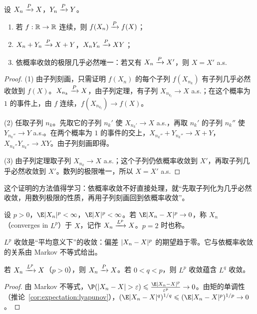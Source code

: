 \begin{corollary}[依概率收敛的运算]\label{cor:convergence:continuous-mapping}
设 $X_n\xrightarrow{P} X$，$Y_n\xrightarrow{P} Y$。
\begin{enumerate}
\item 若 $f:\mathbb{R}\to\mathbb{R}$ 连续，则 $f(X_n)\xrightarrow{P} f(X)$；
\item $X_n+Y_n\xrightarrow{P} X+Y$，$X_nY_n\xrightarrow{P} XY$；
\item 依概率收敛的极限几乎必然唯一：若又有 $X_n\xrightarrow{P} X'$，则 $X=X'$ a.s.
\end{enumerate}
\end{corollary}
\begin{proof}
(1) 由子列刻画，只需证明 $f(X_n)$ 的每个子列 $f(X_{n_k})$ 有子列几乎必然收敛到 $f(X)$。$X_{n_k}\xrightarrow{P} X$，由子列定理，有子列 $X_{n_{k_l}}\to X$ a.s.；在这个概率为 $1$ 的事件上，由 $f$ 连续，$f(X_{n_{k_l}})\to f(X)$。

(2) 任取子列 $n_k$。先取它的子列 $n_k'$ 使 $X_{n_k'}\to X$ a.s.，再取 $n_k'$ 的子列 $n_k''$ 使 $Y_{n_k''}\to Y$ a.s.。在两个概率为 $1$ 的事件的交上，$X_{n_k''}+Y_{n_k''}\to X+Y$，$X_{n_k''}Y_{n_k''}\to XY$。由子列刻画即得。

(3) 由子列定理取子列 $X_{n_k}\to X$ a.s.；这个子列仍依概率收敛到 $X'$，再取子列几乎必然收敛到 $X'$。数列的极限唯一，所以 $X=X'$ a.s.
\end{proof}

这个证明的方法值得学习：依概率收敛不好直接处理，就“先取子列化为几乎必然收敛，用数列极限的性质，再用子列刻画回到依概率收敛”。


\begin{definition}[$L^p$ 收敛]\label{def:convergence:Lp}
设 $p>0$，$\E\abs{X_n}^p<\infty$，$\E\abs X^p<\infty$。若 $\E\abs{X_n-X}^p\to0$，称 $X_n$ （converges in $L^p$）于 $X$，记作 $X_n\xrightarrow{L^{p}} X$。$p=2$ 时也称。
\end{definition}

$L^p$ 收敛是“平均意义下”的收敛：偏差 $\lvert X_n-X\rvert^p$ 的期望趋于零。它与依概率收敛的关系由 Markov 不等式给出。

\begin{theorem}\label{thm:convergence:Lp-implies-p}
若 $X_n\xrightarrow{L^{p}} X$（$p>0$），则 $X_n\xrightarrow{P} X$。若 $0<q<p$，则 $L^p$ 收敛蕴含 $L^q$ 收敛。
\end{theorem}
\begin{proof}
由 Markov 不等式，$\P(\abs{X_n-X}>\varepsilon)\leqslant\frac{\E\abs{X_n-X}^p}{\varepsilon^p}\to0$。由矩的单调性（推论~\ref{cor:expectation:lyapunov}），$(\E\abs{X_n-X}^q)^{1/q}\leqslant(\E\abs{X_n-X}^p)^{1/p}\to0$。
\end{proof}

